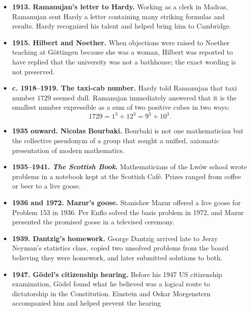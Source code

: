 \begin{itemize}
              orally present all twenty-three problems; ten were delivered in
              the lecture, while the complete list appeared in print.
        \item \textbf{1913. Ramanujan's letter to Hardy.} Working as a clerk in
              Madras, Ramanujan sent Hardy a letter containing many striking
              formulas and results. Hardy recognized his talent and helped
              bring him to Cambridge.
        \item \textbf{1915. Hilbert and Noether.} When objections were raised to
              Noether teaching at Göttingen because she was a woman, Hilbert
              was reported to have replied that the university was not a
              bathhouse; the exact wording is not preserved.
        \item \textbf{c. 1918--1919. The taxi-cab number.} Hardy told Ramanujan that taxi
              number $1729$ seemed dull. Ramanujan immediately answered that it
              is the smallest number expressible as a sum of two positive cubes
              in two ways:
              \[
                  1729=1^3+12^3=9^3+10^3.
              \]
        \item \textbf{1935 onward. Nicolas Bourbaki.} Bourbaki is not one mathematician but
              the collective pseudonym of a group that sought a unified,
              axiomatic presentation of modern mathematics.
        \item \textbf{1935--1941. \textit{The Scottish Book}.} Mathematicians of the Lwów
              school wrote problems in a notebook kept at the Scottish Café.
              Prizes ranged from coffee or beer to a live goose.
        \item \textbf{1936 and 1972. Mazur's goose.} Stanisław Mazur offered a live goose for
              Problem 153 in 1936. Per Enflo solved the basis problem in 1972,
              and Mazur presented the promised goose in a televised ceremony.
        \item \textbf{1939. Dantzig's homework.} George Dantzig arrived late to
              Jerzy Neyman's statistics class, copied two unsolved problems
              from the board believing they were homework, and later submitted
              solutions to both.
        \item \textbf{1947. Gödel's citizenship hearing.} Before his 1947 US
              citizenship examination, Gödel found what he believed was a
              logical route to dictatorship in the Constitution. Einstein and
              Oskar Morgenstern accompanied him and helped prevent the hearing

\end{itemize}
